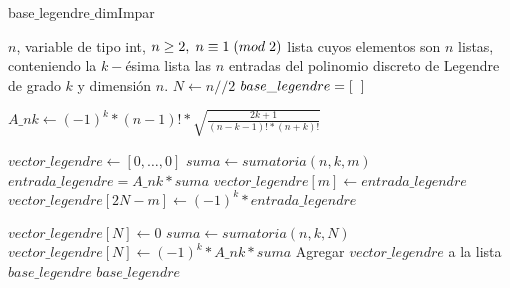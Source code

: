 \begin{algorithm}
\caption{base$\_$legendre$\_$dimImpar}\label{alg: legendre Impar}
\begin{algorithmic}[1] 
\REQUIRE $n$, variable de tipo int, $n \geq 2, \hspace{0.1cm} n \equiv 1 \hspace{0.1cm} (mod \hspace{0.1cm} 2)$
\ENSURE lista cuyos elementos son $n$ listas, conteniendo
la $k-$ésima lista las $n$ entradas del polinomio discreto de Legendre de
grado $k$ y dimensión $n$.
\STATE $N \leftarrow n//2$
\STATE $base\_legendre=[ \hspace{0.2cm} ]$ 

\STATE $A\_nk \leftarrow (-1)^{k}*(n-1)!*
\sqrt{\frac{
2k+1
}{
(n-k-1)!*(n+k)!
}}$

\STATE $vector\_legendre \leftarrow [ 0, \ldots , 0]$  
\STATE $suma \leftarrow sumatoria(n,k,m)$
\STATE $entrada\_legendre=A\_nk * suma$
\STATE $vector\_legendre[m] \leftarrow entrada\_legendre$ 
\STATE $vector\_legendre[2N-m] \leftarrow (-1)^{k}*entrada\_legendre$ 
\ENDFOR

\STATE $vector\_legendre[N] \leftarrow 0$
\ELSE
\STATE $suma \leftarrow sumatoria(n,k,N)$
\STATE $vector\_legendre[N] \leftarrow (-1)^{k}*A\_nk * suma$
\ENDIF
\STATE Agregar $vector\_legendre$ a la lista $base\_legendre$
\ENDFOR
\RETURN $base\_legendre$
\end{algorithmic}
\end{algorithm}



